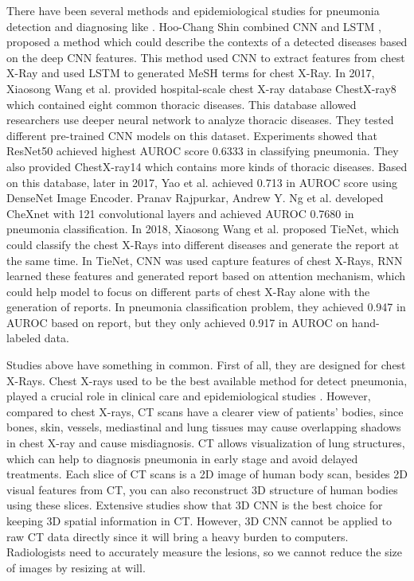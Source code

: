 \documentclass[journal]{IEEEtran}
\begin{document}
There have been several methods and epidemiological studies for pneumonia detection and diagnosing like \cite{Shin2016Learning} \cite{deepika2018classification}.
Hoo-Chang Shin \cite{Shin2016Learning} combined CNN and LSTM \cite{hochreiter1997long}, proposed a method which could describe the contexts of a detected diseases based on the deep CNN features. This method used CNN to extract features from chest X-Ray and used LSTM to generated MeSH \cite{timmurphy.org} terms for chest X-Ray. In 2017, Xiaosong Wang et al. \cite{Wang2017ChestX} provided hospital-scale chest X-ray database ChestX-ray8 which contained eight common thoracic diseases. This database allowed researchers use deeper neural network to analyze thoracic diseases. They tested different pre-trained CNN models on this dataset. Experiments showed that ResNet50 achieved highest AUROC score 0.6333 in classifying pneumonia. They also provided ChestX-ray14 which contains more kinds of thoracic diseases.
Based on this database, later in 2017, Yao et al. \cite{yao2017learning} achieved 0.713 in AUROC score using DenseNet Image Encoder. Pranav Rajpurkar, Andrew Y. Ng et al. \cite{Rajpurkar2017CheXNet} developed CheXnet with 121 convolutional layers and achieved AUROC 0.7680 in pneumonia classification.
In 2018, Xiaosong Wang et al. \cite{Wang2018TieNet} proposed TieNet, which could classify the chest X-Rays into different diseases and generate the report at the same time. In TieNet, CNN was used capture features of chest X-Rays, RNN learned these features and generated report based on attention mechanism, which could help model to focus on different parts of chest X-Ray alone with the generation of reports. In pneumonia classification problem, they achieved 0.947 in AUROC based on report, but they only achieved 0.917 in AUROC on hand-labeled data. 

Studies above have something in common. First of all, they are designed for chest X-Rays. Chest X-rays used to be the best available method for detect pneumonia, played a crucial role in clinical care and epidemiological studies \cite{Franquet2001Imaging} \cite{Thomas2005Standardized}. However, compared to chest X-rays, CT scans have a clearer view of patients' bodies, since bones, skin, vessels, mediastinal and lung tissues may cause overlapping shadows in chest X-ray and cause misdiagnosis. CT allows visualization of lung structures\cite{korfiatis2009texture}, which can help to diagnosis pneumonia in early stage and avoid delayed treatments.
Each slice of CT scans is a 2D image of human body scan, besides 2D visual features from CT, you can also reconstruct 3D structure of human bodies using these slices. Extensive studies show that 3D CNN is the best choice for keeping 3D spatial information in CT\cite{Yorozu1987Electron}. However, 3D CNN cannot be applied to raw CT data directly since it will bring a heavy burden to computers. Radiologists need to accurately measure the lesions, so we cannot reduce the size of images by resizing at will.
 
\end{document}
